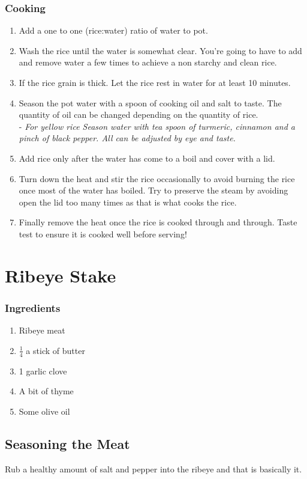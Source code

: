 \subsubsection{Cooking}
\begin{enumerate}
    \item Add a one to one (rice:water) ratio of water to pot.
    \item Wash the rice until the water is somewhat clear. You're going to have to add and remove water a few times to achieve a non starchy and clean rice.
    \item If the rice grain is thick. Let the rice rest in water for at least 10 minutes.
    \item Season the pot water with a spoon of cooking oil and salt to taste. The quantity of oil can be changed depending on the quantity of rice.\\
        - \textit{For yellow rice Season water with tea spoon of turmeric, cinnamon and a pinch of black pepper. All can be adjusted by eye and taste.}
    \item Add rice only after the water has come to a boil and cover with a lid.
    \item Turn down the heat and stir the rice occasionally to avoid burning the rice once most of the water has boiled. Try to preserve the steam by avoiding open the lid too many times as that is what cooks the rice.
    \item Finally remove the heat once the rice is cooked through and through. Taste test to ensure it is cooked well before serving!
\end{enumerate}

\section{Ribeye Stake}
\subsubsection{Ingredients}
\begin{enumerate}
    \item Ribeye meat
    \item $\frac{1}{4}$ a stick of butter
    \item 1 garlic clove
    \item A bit of thyme
    \item Some olive oil
\end{enumerate}

\subsection{Seasoning the Meat}
Rub a healthy amount of salt and pepper into the ribeye and that is basically it.

